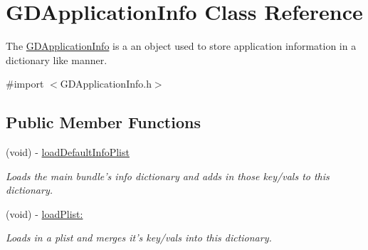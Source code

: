 \hypertarget{interface_g_d_application_info}{
\section{GDApplicationInfo Class Reference}
\label{interface_g_d_application_info}
}


The \hyperlink{interface_g_d_application_info}{GDApplicationInfo} is a an object used to store application information in a dictionary like manner.  


{\ttfamily \#import $<$GDApplicationInfo.h$>$}\subsection*{Public Member Functions}
\begin{DoxyCompactItemize}
\item 
\hypertarget{interface_g_d_application_info_aac751787b64c2db4a74cd3bec895effd}{
(void) -\/ \hyperlink{interface_g_d_application_info_aac751787b64c2db4a74cd3bec895effd}{loadDefaultInfoPlist}}
\label{interface_g_d_application_info_aac751787b64c2db4a74cd3bec895effd}

\begin{DoxyCompactList}\small\item\em Loads the main bundle's info dictionary and adds in those key/vals to this dictionary. \item\end{DoxyCompactList}\item 
\hypertarget{interface_g_d_application_info_a3fff09fcb4eaa3b220b2f256e2140e28}{
(void) -\/ \hyperlink{interface_g_d_application_info_a3fff09fcb4eaa3b220b2f256e2140e28}{loadPlist:}}
\label{interface_g_d_application_info_a3fff09fcb4eaa3b220b2f256e2140e28}

\begin{DoxyCompactList}\small\item\em Loads in a plist and merges it's key/vals into this dictionary. \item\end{DoxyCompactList}\end{DoxyCompactItemize}
